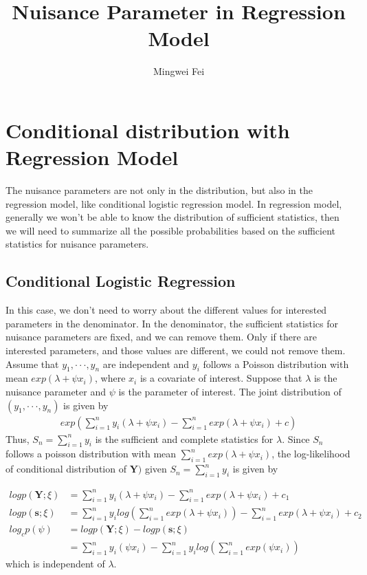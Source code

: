 \documentclass[11pt]{article} %
\title{Nuisance Parameter in Regression Model}
\author{Mingwei Fei}
\begin{document}
\maketitle

\section{Conditional distribution with Regression Model}
The nuisance parameters are not only in the distribution, but also in the regression model, like conditional logistic regression model. In regression model, generally we won't be able to know the distribution of sufficient statistics, then we will need to summarize all the possible probabilities based on the sufficient statistics for nuisance parameters.


\subsection{Conditional Logistic Regression}
In this case, we don't need to worry about the different values for interested parameters in the denominator. In the denominator, the sufficient statistics for nuisance parameters are fixed, and we can remove them. Only if there are interested parameters, and those values are different, we could not remove them.\\


Assume that $y_1, · · · , y_n$ are independent and $y_i$ follows a Poisson distribution with mean $exp(\lambda + \psi x_i)$, where $x_i$ is a covariate of interest. Suppose that $\lambda$ is the nuisance parameter and $\psi$ is the parameter of interest. The joint distribution of $(y_1, · · · , y_n)$ is given by 
\begin{align*}
    exp \left( \sum_{i=1}^n y_i(\lambda + \psi x_i) - \sum_{i=1}^n exp(\lambda + \psi x_i) +c \right)
 \end{align*}
Thus, $S_n = \sum_{i=1}^n y_i$ is the sufficient and complete statistics for $\lambda$. Since $S_n$ follows a poisson distribution with mean $\sum_{i=1}^n exp(\lambda + \psi x_i)$, the log-likelihood of conditional distribution of $\textbf{Y})$ given $S_n = \sum_{i=1}^n y_i$ is given by

\begin{align*}
    log p(\textbf{Y}; \xi) &= \sum_{i=1}^n y_i(\lambda + \psi x_i) - \sum_{i=1}^n exp(\lambda + \psi x_i) +c_1\\
    log p(\textbf{s}; \xi) &= \sum_{i=1}^n y_i log \left( \sum_{i=1}^n exp(\lambda + \psi x_i) \right) - \sum_{i=1}^n exp(\lambda + \psi x_i) +c_2\\
   log_c p(\psi) &= log p(\textbf{Y}; \xi) - log p(\textbf{s}; \xi) \\
   &=   \sum_{i=1}^n y_i(\psi x_i) - \sum_{i=1}^n y_i log \left( \sum_{i=1}^n exp(\psi x_i) \right)
 \end{align*}
 which is independent of $\lambda$. \\
 
\end{document}
